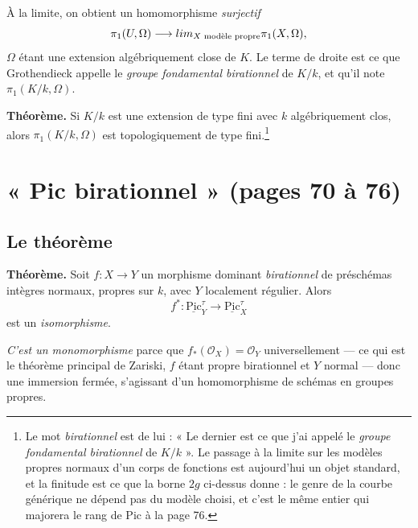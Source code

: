 \documentclass[11pt,a4paper]{article}
\begin{document}

À la limite, on obtient un homomorphisme \emph{surjectif}
\[
  \pi_{1}(U, \Omega) \longrightarrow
  \varprojlim_{X \text{ modèle propre}} \pi_{1}(X, \Omega) ,
\]
$\Omega$ étant une extension algébriquement close de $K$. Le terme de droite est
ce que Grothendieck appelle le \emph{groupe fondamental birationnel} de $K/k$,
et qu'il note $\pi_{1}(K/k, \Omega)$.

\textbf{Théorème.} Si $K/k$ est une extension de type fini avec $k$
algébriquement clos, alors $\pi_{1}(K/k, \Omega)$ est topologiquement de type
fini.\footnote{Le mot \emph{birationnel} est de lui : « Le dernier est ce que
j'ai appelé le \emph{groupe fondamental birationnel} de $K/k$ ». Le passage à
la limite sur les modèles propres normaux d'un corps de fonctions est
aujourd'hui un objet standard, et la finitude est ce que la borne $2g$ ci-dessus
donne : le genre de la courbe générique ne dépend pas du modèle choisi, et
c'est le même entier qui majorera le rang de $\mathrm{Pic}$ à la page 76.}

\section*{« Pic birationnel » (pages 70 à 76)}

\subsection*{Le théorème}

\textbf{Théorème.} Soit $f : X \to Y$ un morphisme dominant \emph{birationnel}
de préschémas intègres normaux, propres sur $k$, avec $Y$ localement régulier.
Alors
\[
  f^{*} : \underline{\mathrm{Pic}}^{\tau}_{Y} \longrightarrow
  \underline{\mathrm{Pic}}^{\tau}_{X}
\]
est un \emph{isomorphisme}.

\emph{C'est un monomorphisme} parce que $f_{*}(\mathcal{O}_{X}) =
\mathcal{O}_{Y}$ universellement --- ce qui est le théorème principal de
Zariski, $f$ étant propre birationnel et $Y$ normal --- donc une immersion
fermée, s'agissant d'un homomorphisme de schémas en groupes propres.
\end{document}
